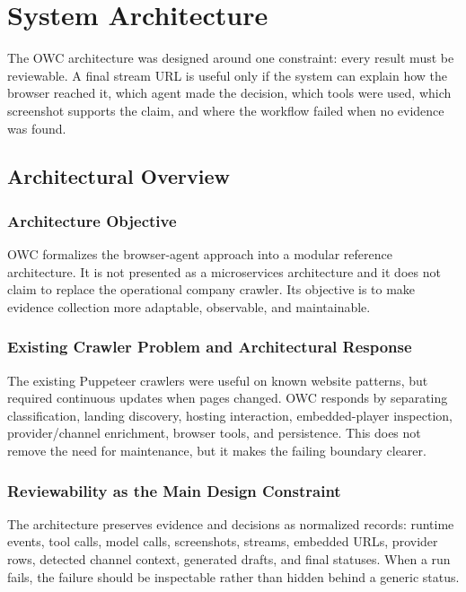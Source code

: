 \chapter{System Architecture}
\label{chap:architecture}

The OWC architecture was designed around one constraint: every result must be
reviewable. A final stream URL is useful only if the system can explain how the
browser reached it, which agent made the decision, which tools were used, which
screenshot supports the claim, and where the workflow failed when no evidence
was found.

\section{Architectural Overview}

\subsection{Architecture Objective}

OWC formalizes the browser-agent approach into a modular reference
architecture. It is not presented as a microservices architecture and it does
not claim to replace the operational company crawler. Its objective is to make
evidence collection more adaptable, observable, and maintainable.

\subsection{Existing Crawler Problem and Architectural Response}

The existing Puppeteer crawlers were useful on known website patterns, but
required continuous updates when pages changed. OWC responds by separating
classification, landing discovery, hosting interaction, embedded-player
inspection, provider/channel enrichment, browser tools, and persistence. This
does not remove the need for maintenance, but it makes the failing boundary
clearer.

\subsection{Reviewability as the Main Design Constraint}

The architecture preserves evidence and decisions as normalized records:
runtime events, tool calls, model calls, screenshots, streams, embedded URLs,
provider rows, detected channel context, generated drafts, and final statuses.
When a run fails, the failure should be inspectable rather than hidden behind a
generic status.


